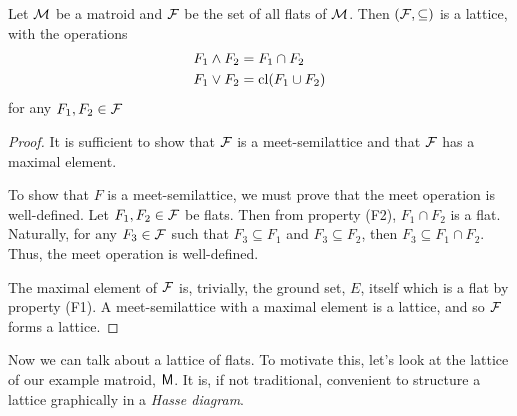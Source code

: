\documentclass[12pt,oneside]{../../sfsuthesis}
\begin{document}
\begin{lemma}\th\label{thm:flatLattice}
    Let \( \mathcal{M} \) be a matroid and \( \mathcal{F} \) be the set of all flats of \( \mathcal{M} \).
    Then \( ( \mathcal{F}, \subseteq) \) is a lattice, with the operations
    \begin{align*}
        F_1 \wedge F_2 & = F_1 \cap F_2      \\
        F_1 \vee F_2   & = \operatorname{cl}(F_1 \cup F_2)
    \end{align*}
    for any \( F_1, F_2 \in \mathcal{F} \)
\end{lemma}
\begin{proof}
    It is sufficient to show that \( \mathcal{F} \) is a meet-semilattice and that \( \mathcal{F} \) has a maximal element.

    To show that \( F \) is a meet-semilattice, we must prove that the meet operation is well-defined.
    Let \( F_1, F_2 \in \mathcal{F} \) be flats.
    Then from property (F2), \( F_1 \cap F_2 \) is a flat.
    Naturally, for any \( F_3 \in \mathcal{F} \) such that  \( F_3 \subseteq  F_1 \) and \( F_3 \subseteq F_2 \), then \( F_3 \subseteq F_1 \cap F_2 \).
    Thus, the meet operation is well-defined.

    The maximal element of \( \mathcal{F} \) is, trivially, the ground set, \( E \), itself which is a flat by property (F1).
    A meet-semilattice with a maximal element is a lattice, and so \( \mathcal{F} \) forms a lattice.
\end{proof}

Now we can talk about a lattice of flats.
To motivate this, let's look at the lattice of our example matroid, \( \mathsf{M} \).
It is, if not traditional, convenient to structure a lattice graphically in a \emph{Hasse diagram}.
\end{document}
